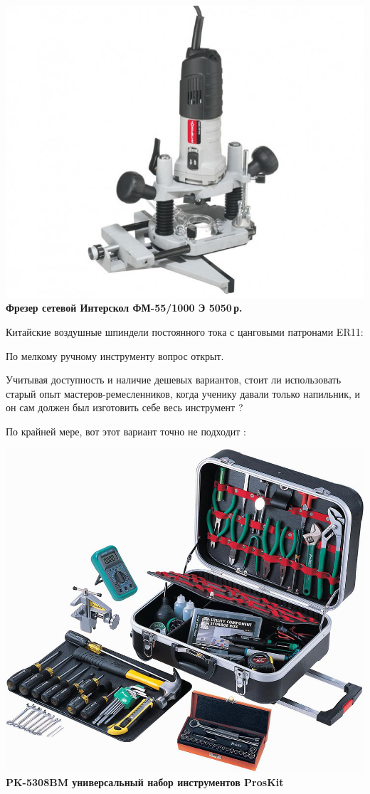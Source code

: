 \documentclass{magazine}
\begin{document}
\begin{multicols}{2}
\noindent\href{http://www.kuvalda.ru/catalog/1867/27920/}{
\includegraphics[width=\columnwidth]{fig/00/InterskolFM55.jpg}}
\textbf{Фрезер сетевой Интерскол ФМ-55/1000 Э 5050\,р.}

\bigskip
Китайские воздушные шпиндели постоянного тока с цанговыми патронами ER11:



\bigskip
По мелкому ручному инструменту вопрос открыт.

Учитывая доступность и наличие дешевых вариантов, стоит ли использовать старый
опыт мастеров-ремесленников, когда ученику давали только напильник, и он сам
должен был изготовить себе весь инструмент ?

По крайней мере, вот этот вариант точно не подходит \smiley:

\noindent\includegraphics[width=\columnwidth]{fig/00/PK5308BM.jpg}
\textbf{PK-5308BM универсальный набор инструментов ProsKit}


\end{multicols}
\end{document}
